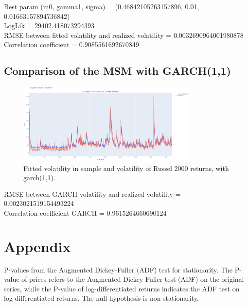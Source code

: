 \documentclass[11pt]{extarticle}
\begin{document}
\FloatBarrier

Best param (m0, gamma1, sigma) = (0.46842105263157896, 0.01, 0.01663157894736842) \\

LogLik = 29402.418073294393 \\

RMSE between fitted volatility and realized volatility = 0.0032690964001980878 \\

Correlation coefficient = 0.9085561692670849 \\



\subsection{Comparison of the MSM with GARCH(1,1)}

\begin{figure}[!ht]
    \centering
    \includegraphics[width=0.8\textwidth]{img/garch_vol}
    \caption{Fitted volatility in sample and volatility of Russel 2000 returns, with garch(1,1).}
    \label{fig:garch_fitted_vol}
\end{figure}

\FloatBarrier

RMSE between GARCH volatility and realized volatility = 0.0023021519154493224 \\

Correlation coefficient GARCH = 0.9615264660690124 \\

\section{Appendix}

\begin{table}[h!]
    \centering
    \caption{P-values from the Augmented Dickey-Fuller (ADF) test for stationarity. The P-value of prices refers to the Augmented Dickey Fuller test (ADF) on the original series,
     while the P-value of log-differentiated returns indicates the ADF test on log-differentiated returns. The null hypothesis is non-stationarity.}
    \label{tab:adf_results}
\end{table}
\end{document}
